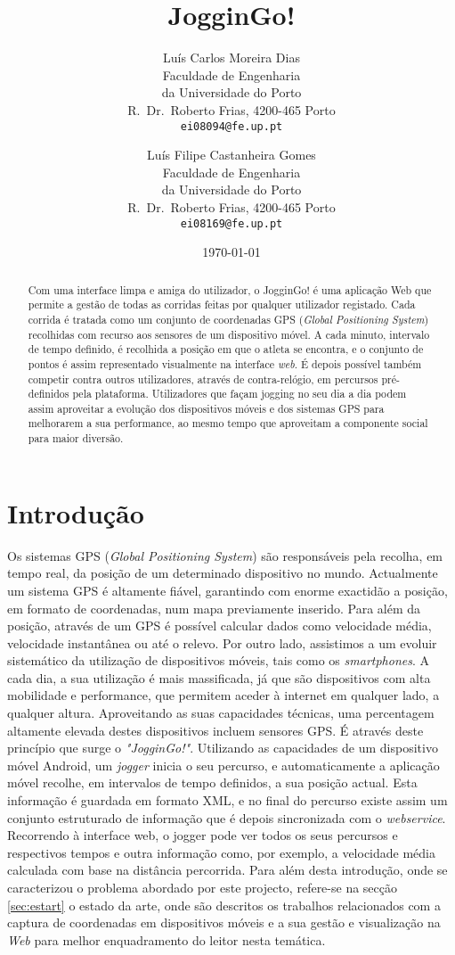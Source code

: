 \documentclass[twocolumn,twoside,10pt,a4paper]{article}
\title{JogginGo! }
\author{Luís Carlos Moreira Dias\\
\small Faculdade de Engenharia\\[-0.8ex]
\small da Universidade do Porto\\[-0.8ex]
\small R.\ Dr.\ Roberto Frias, 4200-465 Porto\\[-0.8ex]
\small \texttt{ei08094@fe.up.pt}\\
\and
Luís Filipe Castanheira Gomes\\
\small Faculdade de Engenharia\\[-0.8ex]
\small da Universidade do Porto\\[-0.8ex]
\small R.\ Dr.\ Roberto Frias, 4200-465 Porto\\[-0.8ex]
\small \texttt{ei08169@fe.up.pt}
}
\date{\today}
\begin{document}
\maketitle
\thispagestyle{plain} 

\begin{abstract}
Com uma interface limpa e amiga do utilizador, o JogginGo! é uma aplicação Web que permite a gestão de todas as corridas feitas por qualquer utilizador registado. Cada corrida é tratada como um conjunto de coordenadas GPS (\textit{Global Positioning System}) recolhidas com recurso aos sensores de um dispositivo móvel. A cada minuto, intervalo de tempo definido, é recolhida a posição em que o atleta se encontra, e o conjunto de pontos é assim representado visualmente na interface \textit{web}. É depois possível também competir contra outros utilizadores, através de contra-relógio, em percursos pré-definidos pela plataforma. Utilizadores que façam jogging no seu dia a dia podem assim aproveitar a evolução dos dispositivos móveis e dos sistemas GPS para melhorarem a sua performance, ao mesmo tempo que aproveitam a componente social para maior diversão.
\end{abstract}

\section{Introdução}\label{sec:intro}

Os sistemas GPS (\emph{Global Positioning System}) são responsáveis pela recolha, em tempo real, da posição de um determinado dispositivo no mundo. Actualmente um sistema GPS é altamente fiável, garantindo com enorme exactidão a posição, em formato de coordenadas, num mapa previamente inserido. Para além da posição, através de um GPS é possível calcular dados como velocidade média, velocidade instantânea ou até o relevo.
Por outro lado, assistimos a um evoluir sistemático da utilização de dispositivos móveis, tais como os \emph{smartphones}. A cada dia, a sua utilização é mais massificada, já que são dispositivos com alta mobilidade e performance, que permitem aceder à internet em qualquer lado, a qualquer altura. Aproveitando as suas capacidades técnicas, uma percentagem altamente elevada destes dispositivos incluem sensores GPS. 
É através deste princípio que surge o \textit{"JogginGo!"}. Utilizando as capacidades de um dispositivo móvel Android, um \emph{jogger} inicia o seu percurso, e automaticamente a aplicação móvel recolhe, em intervalos de tempo definidos, a sua posição actual. Esta informação é guardada em formato XML, e no final do percurso existe assim um conjunto estruturado de informação que é depois sincronizada com o \emph{webservice}. Recorrendo à interface web, o jogger pode ver todos os seus percursos e respectivos tempos e outra informação como, por exemplo, a velocidade média calculada com base na distância percorrida.
Para além desta introdução, onde se caracterizou o problema abordado
por este projecto, refere-se na secção \ref{sec:estart} o
estado da arte, onde são descritos os trabalhos relacionados com a
captura de coordenadas em dispositivos móveis e a sua gestão e visualização na \textit{Web} para melhor enquadramento do leitor nesta temática. 
\end{document}

